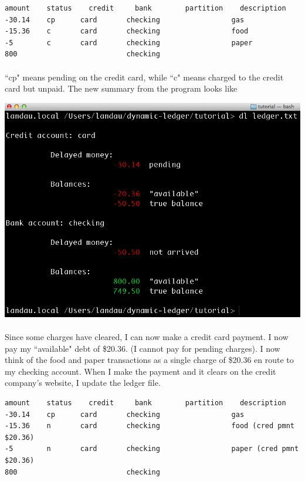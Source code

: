\documentclass{article}
\providecommand{\q}{$\quad$ \newline}
\begin{document}
\begin{flushleft}
\begin{lstlisting}[title=ledger.txt]
amount    status	credit     bank        partition    description
-30.14    cp      card       checking                 gas
-15.36    c       card       checking                 food
-5        c       card       checking                 paper
800                          checking
\end{lstlisting}

\paragraph{} ``cp" means pending on the credit card, while ``c" means charged to the credit card but unpaid. The new summary from the program looks like \q

\begin{center}
\includegraphics[scale=.45]{fig/sum4.png}
\end{center} 

\paragraph{} Since some charges have cleared, I can now make a credit card payment. I now pay my ``available" debt of \$20.36. (I cannot pay for pending charges). I now think of the food and paper transactions as a single charge of \$20.36 en route to my checking account. When I make the payment and it clears on the credit company's website, I update the ledger file.

\begin{lstlisting}[title=ledger.txt]
amount    status	credit     bank        partition    description
-30.14    cp      card       checking                 gas
-15.36    n       card       checking                 food (cred pmnt $20.36)
-5        n       card       checking                 paper (cred pmnt $20.36)
800                          checking
\end{lstlisting}


\end{flushleft}
\end{document}
